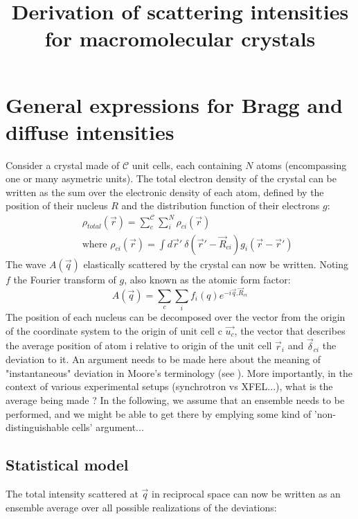\documentclass{article}
\title{Derivation of scattering intensities for macromolecular crystals}
\begin{document}
\maketitle

\tableofcontents

\newpage
\section{General expressions for Bragg and diffuse intensities}
Consider a crystal made of $\mathcal{C}$ unit cells, each containing $N$ atoms (encompassing one or many asymetric units). The total electron density of the crystal can be written as the sum over the electronic density of each atom, defined by the position of their nucleus $R$ and the distribution function of their electrons $g$:
\begin{eqnarray}
	&&\rho_{total}(\vec{r}) = \sum_{c}^{\mathcal{C}}\sum_{i}^{N}\rho_{ci}(\vec{r})\\\nonumber
    &&\text{where }\rho_{ci}(\vec{r})=\int d\vec{r}'\ \delta(\vec{r}'-\vec{R}_{ci})g_{i}(\vec{r}-\vec{r}')
\end{eqnarray}
The wave $A(\vec{q})$ elastically scattered by the crystal can now be written. Noting $f$ the Fourier transform of $g$, also known as the atomic form factor: 
\begin{equation}
	A(\vec{q}) = \sum_{c}\sum_{i}f_{i}(q)e^{-i\vec{q}.\vec{R}_{ci}}
\end{equation}
The position of each nucleus can be decomposed over the vector from the origin of the coordinate system to the origin of unit cell c $\vec{u_c}$, the vector that describes the average  position of atom i relative to origin of the unit cell $\vec{r}_i$ and $\vec{\delta}_{ci}$ the deviation to it. An argument needs to be made here about the meaning of "instantaneous" deviation in Moore's terminology (see \cite{pmid19836331}). More importantly, in the context of various experimental setups (synchrotron vs XFEL...), what is the average being made ? In the following, we assume that an ensemble needs to be performed, and we might be able to get there by emplying some kind of 'non-distinguishable cells' argument...

\subsection{Statistical model}

The total intensity scattered at $\vec{q}$ in reciprocal space can now be written as  an ensemble average over all possible realizations of the deviations:
\end{document}
